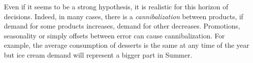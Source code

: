 Even if it seems to be a strong hypothesis, it is realistic for this horizon of decisions.
Indeed, in many cases, there is a \emph{cannibalization} between products, \ie if demand for some products increases, demand for other decreases.
Promotions, seasonality or simply offsets between error can cause cannibalization.
For example, the average consumption of desserts is the same at any time of the year but ice cream demand will represent a bigger part in Summer.


